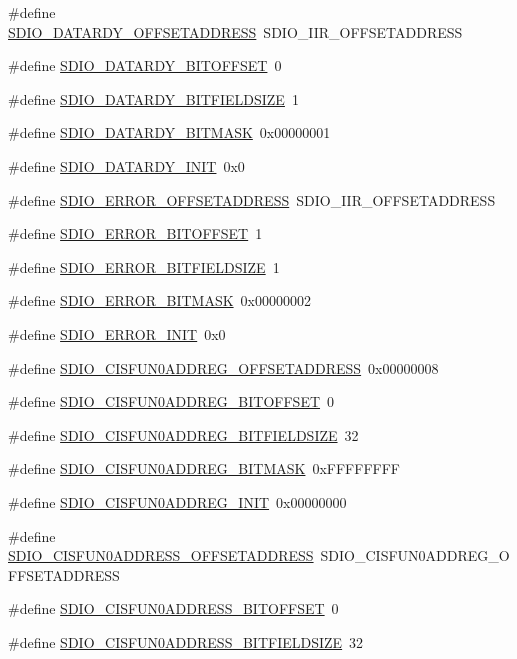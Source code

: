 \begin{DoxyCompactItemize}
\#define \hyperlink{a00571_a5b3ce86b644f25167db2a76513c4bb0a}{SDIO\_\-DATARDY\_\-OFFSETADDRESS}~SDIO\_\-IIR\_\-OFFSETADDRESS
\item 
\#define \hyperlink{a00571_a79425bcf8495719ae8a6672273350fae}{SDIO\_\-DATARDY\_\-BITOFFSET}~0
\item 
\#define \hyperlink{a00571_a34aa4999a26bc4a498c2d49d3c92affb}{SDIO\_\-DATARDY\_\-BITFIELDSIZE}~1
\item 
\#define \hyperlink{a00571_aa00229db511f3857971bfc6db6e9fb96}{SDIO\_\-DATARDY\_\-BITMASK}~0x00000001
\item 
\#define \hyperlink{a00571_afd5f873115191c6ec12001d93d5f4b12}{SDIO\_\-DATARDY\_\-INIT}~0x0
\item 
\#define \hyperlink{a00571_aef95221243006f36e9532d4625acbf93}{SDIO\_\-ERROR\_\-OFFSETADDRESS}~SDIO\_\-IIR\_\-OFFSETADDRESS
\item 
\#define \hyperlink{a00571_ad5f35da858a43e0f388c02aaa0ad1850}{SDIO\_\-ERROR\_\-BITOFFSET}~1
\item 
\#define \hyperlink{a00571_a03dde52df8626a459d4f571fb9215347}{SDIO\_\-ERROR\_\-BITFIELDSIZE}~1
\item 
\#define \hyperlink{a00571_a1d636cba23572d3bd30712ea61c2d237}{SDIO\_\-ERROR\_\-BITMASK}~0x00000002
\item 
\#define \hyperlink{a00571_ac692faa1eebe96f27cbcd51c4f0e364b}{SDIO\_\-ERROR\_\-INIT}~0x0
\item 
\#define \hyperlink{a00571_a24d91a3b89afaebd6c3121cf990473e3}{SDIO\_\-CISFUN0ADDREG\_\-OFFSETADDRESS}~0x00000008
\item 
\#define \hyperlink{a00571_a026c530fefb718f332cb8a74004c5e1f}{SDIO\_\-CISFUN0ADDREG\_\-BITOFFSET}~0
\item 
\#define \hyperlink{a00571_a1503a513e3346c728010341a4f29f64a}{SDIO\_\-CISFUN0ADDREG\_\-BITFIELDSIZE}~32
\item 
\#define \hyperlink{a00571_a69e14ebd9e613706d367ff30d22d06d9}{SDIO\_\-CISFUN0ADDREG\_\-BITMASK}~0xFFFFFFFF
\item 
\#define \hyperlink{a00571_ac2be3df5ec1ea438cd735f8cddbff30c}{SDIO\_\-CISFUN0ADDREG\_\-INIT}~0x00000000
\item 
\#define \hyperlink{a00571_a4c9d87a2c8338cc256f8bb9cf2598944}{SDIO\_\-CISFUN0ADDRESS\_\-OFFSETADDRESS}~SDIO\_\-CISFUN0ADDREG\_\-OFFSETADDRESS
\item 
\#define \hyperlink{a00571_a2c7036d728d40da1af4018f57433d77a}{SDIO\_\-CISFUN0ADDRESS\_\-BITOFFSET}~0
\item 
\#define \hyperlink{a00571_a5997174ca163f33ab4f77908ce25762f}{SDIO\_\-CISFUN0ADDRESS\_\-BITFIELDSIZE}~32

\end{DoxyCompactItemize}
